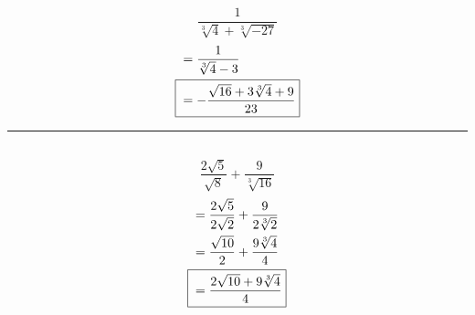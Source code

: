 	\subsection{}
		\[\frac{1}{\sqrt[3]{4} + \sqrt[3]{-27}}\]
		\begin{align*}
			&= \frac{1}{\sqrt[3]{4} - 3} \\
			\Aboxed{{} &= -\frac{\sqrt{16} + 3\sqrt[3]{4} + 9}{23}}
		\end{align*}
		\hrule{}

	\subsection{}
		\[\frac{2\sqrt{5}}{\sqrt{8}} + \frac{9}{\sqrt[3]{16}}\]
		\begin{align*}
			&= \frac{2\sqrt{5}}{2\sqrt{2}} + \frac{9}{2\sqrt[3]{2}} \\
			&= \frac{\sqrt{10}}{2} + \frac{9\sqrt[3]{4}}{4} \\
			\Aboxed{{} &= \frac{2\sqrt{10} + 9\sqrt[3]{4}}{4}}
		\end{align*}

	\pagebreak{}
